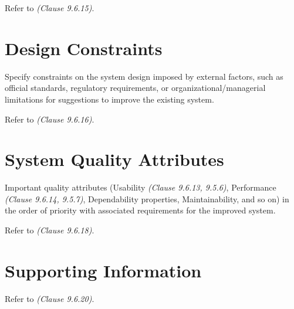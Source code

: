 Refer to \textit{(Clause 9.6.15)}.

\section{Design Constraints}

Specify constraints on the system design imposed by external factors, such as official standards, regulatory requirements, or organizational/managerial limitations for suggestions to improve the existing system.

Refer to \textit{(Clause 9.6.16)}.

\section{System Quality Attributes}

Important quality attributes (Usability \textit{(Clause 9.6.13, 9.5.6)}, Performance \textit{(Clause 9.6.14, 9.5.7)}, Dependability properties, Maintainability, and so on) in the order of priority with associated requirements for the improved system.

Refer to \textit{(Clause 9.6.18)}.

\section{Supporting Information}

Refer to \textit{(Clause 9.6.20)}.